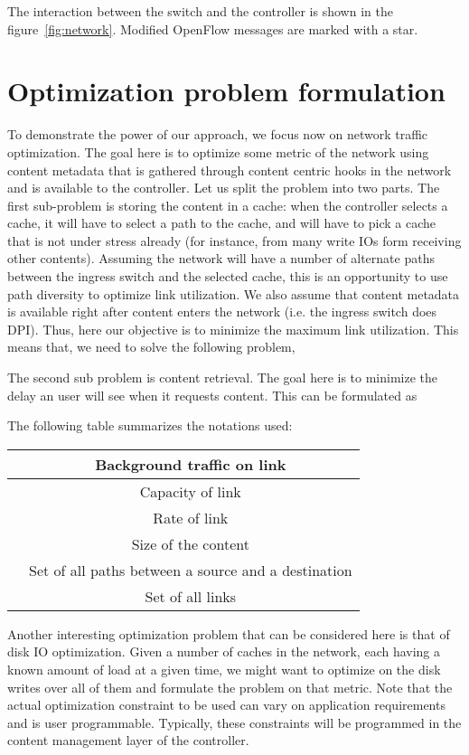 \documentclass[conference]{IEEEtran}
\begin{document}
The interaction between the switch and the controller is shown in the figure~\ref{fig:network}. Modified OpenFlow messages are marked with a star.




\section{Optimization problem formulation}
\label{sec:optimization}
To demonstrate the power of our approach, we focus now
on network traffic optimization. The goal here is to optimize
some metric of the network using content metadata that is
gathered through content centric hooks in the network and
is available to the controller. Let us split the problem into
two parts. The first sub-problem is storing the content in a
cache: when the controller selects a cache, it will have to
select a path to the cache, and will have to pick a cache that
is not under stress already (for instance, from many write
IOs form receiving other contents). Assuming the network
will have a number of alternate paths between the ingress
switch and the selected cache, this is an opportunity to use
path diversity to optimize link utilization. We also assume
that content metadata is available right after content enters
the network (i.e. the ingress switch does DPI). Thus, here our
objective is to minimize the maximum link utilization. This
means that, we need to solve the following problem,


The second sub problem is content retrieval. The goal here is to minimize the delay an user will see when it requests content. This can be formulated as


The following table summarizes the notations used:
\begin{center}
  \begin{tabular}{| c | c |}
    \hline
     & Background traffic on link  \\ \hline
     & Capacity of link  \\ \hline
     & Rate of link  \\ \hline
     & Size of the content \\ \hline
     & Set of all paths between a source and a destination\\ \hline
     & Set of all links\\
    \hline
  \end{tabular}
\end{center}
Another interesting optimization problem that can be considered
here is that of disk IO optimization. Given a number of
caches in the network, each having a known amount of load
at a given time, we might want to optimize on the disk writes
over all of them and formulate the problem on that metric.
Note that the actual optimization constraint to be used can
vary on application requirements and is user programmable.
Typically, these constraints will be programmed in the content
management layer of the controller.
\end{document}
